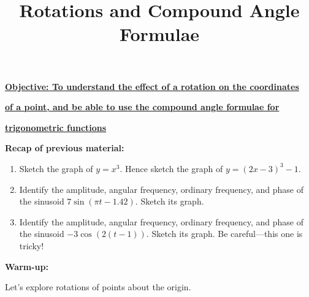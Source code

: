 \documentclass{article}
\begin{document}
\title{Rotations and Compound Angle Formulae}
\date{}

\maketitle
\thispagestyle{empty}

\Large

\textbf{\underline{Objective: To understand the effect of a rotation on the coordinates}}

\textbf{\underline{of a point, and be able to use the compound angle formulae for}}

\textbf{\underline{trigonometric functions}}



\vspace{5mm}


\textbf{Recap of previous material:}

\vspace{5mm}


\begin{enumerate}
\item Sketch the graph of $y=x^3$. Hence sketch the graph of $y=(2x-3)^3-1$.
\item Identify the amplitude, angular frequency, ordinary frequency, and phase of the sinusoid $7\sin(\pi t-1.42)$. Sketch its graph.
\item Identify the amplitude, angular frequency, ordinary frequency, and phase of the sinusoid $-3\cos(2(t-1))$. Sketch its graph. Be careful---this one is tricky!
\end{enumerate}


\clearpage


\textbf{Warm-up:}

\vspace{5mm}

Let's explore rotations of points about the origin.
\end{document}
